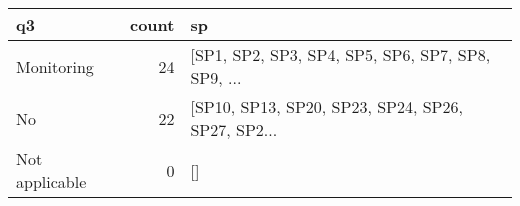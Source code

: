 \begin{tabular}{lrl}
\toprule
             q3 &  count &                                                 sp \\
\midrule
     Monitoring &     24 &  [SP1, SP2, SP3, SP4, SP5, SP6, SP7, SP8, SP9, ... \\
             No &     22 &  [SP10, SP13, SP20, SP23, SP24, SP26, SP27, SP2... \\
 Not applicable &      0 &                                                 [] \\
\bottomrule
\end{tabular}
